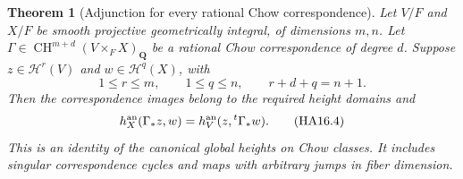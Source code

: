 \documentclass[11pt,a4paper]{article}
\newtheorem{theorem}{Theorem}[section]
\theoremstyle{definition}
\theoremstyle{remark}
\numberwithin{equation}{section}
\begin{document}
\begin{theorem}[Adjunction for every rational Chow correspondence]
\label{r16ha:adjunction}
Let $V/F$ and $X/F$ be smooth projective geometrically integral,
of dimensions $m,n$. Let
$\Gamma\in\operatorname{CH}^{m+d}(V\times_FX)_{\mathbf Q}$
be a rational Chow correspondence of degree $d$. Suppose
$z\in\mathcal H^r(V)$ and $w\in\mathcal H^q(X)$, with
\[
 1\leq r\leq m,\qquad 1\leq q\leq n,\qquad
                         r+d+q=n+1.
 \tag{HA16.3}\label{r16ha:degrees}
\]
Then the correspondence images belong to the required height
domains and
\[
 h_X^{\rm an}(\Gamma_*z,w)
              =h_V^{\rm an}(z,{}^t\Gamma_*w).
 \tag{HA16.4}\label{r16ha:adjunction-eq}
\]
This is an identity of the canonical global heights on Chow
classes. It includes singular correspondence cycles and maps
with arbitrary jumps in fiber dimension.
\end{theorem}
\end{document}
